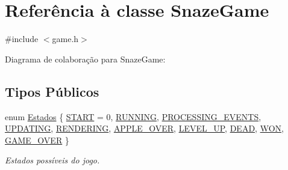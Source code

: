 \hypertarget{classSnazeGame}{}\section{Referência à classe Snaze\+Game}
\label{classSnazeGame}


{\ttfamily \#include $<$game.\+h$>$}



Diagrama de colaboração para Snaze\+Game\+:
\subsection*{Tipos Públicos}
\begin{DoxyCompactItemize}
\item 
enum \hyperlink{classSnazeGame_a10ea6cb420042fdbfcade4f0261af5c1}{Estados} \{ \newline
\hyperlink{classSnazeGame_a10ea6cb420042fdbfcade4f0261af5c1afc64d93c34fbd8df2d79fefbb8513c8f}{S\+T\+A\+RT} = 0, 
\hyperlink{classSnazeGame_a10ea6cb420042fdbfcade4f0261af5c1a96daa8d1688cbf422ad289b82e3e1d49}{R\+U\+N\+N\+I\+NG}, 
\hyperlink{classSnazeGame_a10ea6cb420042fdbfcade4f0261af5c1a45fe6e347b32aabd0854ab91e434b633}{P\+R\+O\+C\+E\+S\+S\+I\+N\+G\+\_\+\+E\+V\+E\+N\+TS}, 
\hyperlink{classSnazeGame_a10ea6cb420042fdbfcade4f0261af5c1a30387f75fa4f94a804d1010ab5784276}{U\+P\+D\+A\+T\+I\+NG}, 
\newline
\hyperlink{classSnazeGame_a10ea6cb420042fdbfcade4f0261af5c1af7314565e55dcf48d180288a376dccec}{R\+E\+N\+D\+E\+R\+I\+NG}, 
\hyperlink{classSnazeGame_a10ea6cb420042fdbfcade4f0261af5c1ac5e341ca42210bd95d5cf25621c7a613}{A\+P\+P\+L\+E\+\_\+\+O\+V\+ER}, 
\hyperlink{classSnazeGame_a10ea6cb420042fdbfcade4f0261af5c1ad89c12ed069a00f65612ea3dc9f8a698}{L\+E\+V\+E\+L\+\_\+\+UP}, 
\hyperlink{classSnazeGame_a10ea6cb420042fdbfcade4f0261af5c1a86eedf6a4b84c34f610f2a5c9e65a3a5}{D\+E\+AD}, 
\newline
\hyperlink{classSnazeGame_a10ea6cb420042fdbfcade4f0261af5c1a25d7611aaf59f55bef9266b861ea7208}{W\+ON}, 
\hyperlink{classSnazeGame_a10ea6cb420042fdbfcade4f0261af5c1a1d07a70b0238ff34f848549583262ee9}{G\+A\+M\+E\+\_\+\+O\+V\+ER}
 \}\begin{DoxyCompactList}\small\item\em Estados possíveis do jogo. \end{DoxyCompactList}
\end{DoxyCompactItemize}
